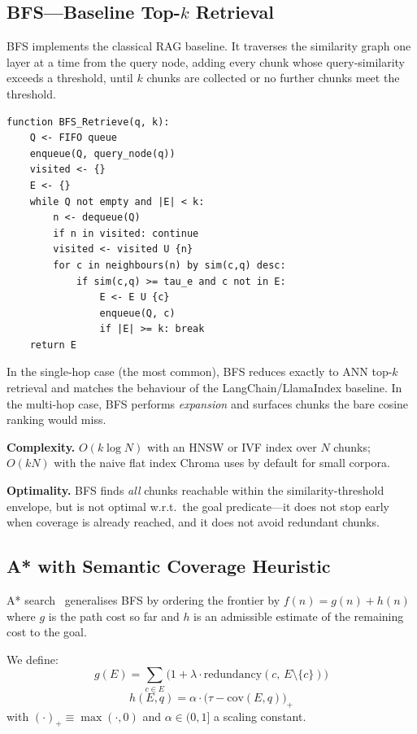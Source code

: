 \documentclass[conference]{IEEEtran}
\begin{document}
\subsection{BFS---Baseline Top-\texorpdfstring{$k$}{k} Retrieval}

BFS implements the classical RAG baseline. It traverses the similarity graph
one layer at a time from the query node, adding every chunk whose
query-similarity exceeds a threshold, until $k$ chunks are collected or no
further chunks meet the threshold.

\begin{lstlisting}[caption={BFS retrieval pseudocode.},label={alg:bfs}]
function BFS_Retrieve(q, k):
    Q <- FIFO queue
    enqueue(Q, query_node(q))
    visited <- {}
    E <- {}
    while Q not empty and |E| < k:
        n <- dequeue(Q)
        if n in visited: continue
        visited <- visited U {n}
        for c in neighbours(n) by sim(c,q) desc:
            if sim(c,q) >= tau_e and c not in E:
                E <- E U {c}
                enqueue(Q, c)
                if |E| >= k: break
    return E
\end{lstlisting}

In the single-hop case (the most common), BFS reduces exactly to ANN top-$k$
retrieval and matches the behaviour of the LangChain/LlamaIndex baseline. In
the multi-hop case, BFS performs \textit{expansion} and surfaces chunks the
bare cosine ranking would miss.

\textbf{Complexity.} $O(k \log N)$ with an HNSW or IVF index over $N$ chunks;
$O(kN)$ with the naive flat index Chroma uses by default for small corpora.

\textbf{Optimality.} BFS finds \textit{all} chunks reachable within the
similarity-threshold envelope, but is not optimal w.r.t.\ the goal
predicate---it does not stop early when coverage is already reached, and it
does not avoid redundant chunks.

\subsection{A* with Semantic Coverage Heuristic}

A* search~\cite{hart1968astar} generalises BFS by ordering the frontier by
$f(n) = g(n) + h(n)$ where $g$ is the path cost so far and $h$ is an
admissible estimate of the remaining cost to the goal.

We define:
\begin{equation}
  g(E) = \sum_{c \in E}
         \bigl(1 + \lambda \cdot \mathrm{redundancy}(c,\,E\setminus\{c\})\bigr)
  \label{eq:g}
\end{equation}
\begin{equation}
  h(E, q) = \alpha \cdot \bigl(\tau - \mathrm{cov}(E, q)\bigr)_{+}
  \label{eq:h}
\end{equation}
with $(\cdot)_{+} \equiv \max(\cdot,0)$ and $\alpha \in (0,1]$ a scaling
constant.
\end{document}
